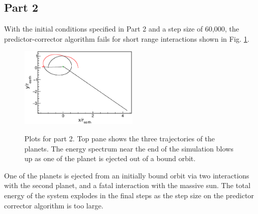 \documentclass[singlepage,notitlepage,nofootinbib,11pt]{revtex4-1}
\begin{document}
\subsection{Part 2}
With the initial conditions specified in Part 2 and a step size of 60,000, the predictor-corrector algorithm fails for short range interactions shown in Fig. \ref{fig2}.
\begin{figure}[h]
  \centering
  \includegraphics[width=0.5\textwidth]{figures/2r.eps}
  \\
\hfill
  \caption{\label{fig2} Plots for part 2. Top pane shows the three trajectories of the planets. The energy spectrum near the end of the simulation blows up as one of the planet is ejected out of a bound orbit.}
\end{figure}
One of the planets is ejected from an initially bound orbit via two interactions with the second planet, and a fatal interaction with the massive sun. The total energy of the system explodes in the final steps as the step size on the predictor corrector algorithm is too large.
\clearpage
\end{document}

